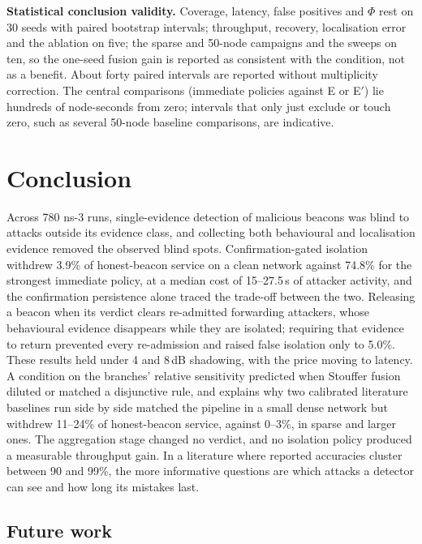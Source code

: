 \textbf{Statistical conclusion validity.} Coverage, latency, false positives
and $\Phi$ rest on 30 seeds with paired bootstrap intervals; throughput,
recovery, localisation error and the ablation on five; the sparse and 50-node
campaigns and the sweeps on ten, so the one-seed fusion gain is reported as
consistent with the condition, not as a benefit. About forty paired intervals
are reported without multiplicity correction. The central comparisons
(immediate policies against E or E$'$) lie hundreds of node-seconds from zero;
intervals that only just exclude or touch zero, such as several 50-node
baseline comparisons, are indicative.

\section{Conclusion}
\label{sec:conclusion}

Across 780 ns-3 runs, single-evidence detection of malicious beacons was blind
to attacks outside its evidence class, and collecting both behavioural and
localisation evidence removed the observed blind spots. Confirmation-gated
isolation withdrew 3.9\% of honest-beacon service on a clean network against
74.8\% for the strongest immediate policy, at a median cost of 15--27.5\,s of
attacker activity, and the confirmation persistence alone traced the
trade-off between the two. Releasing a beacon when its verdict clears
re-admitted forwarding attackers, whose behavioural evidence disappears while
they are isolated; requiring that evidence to return prevented every
re-admission and raised false isolation only to 5.0\%. These results held
under 4 and 8\,dB shadowing, with the price moving to latency. A condition on
the branches' relative sensitivity predicted when Stouffer fusion diluted or
matched a disjunctive rule, and explains why two calibrated literature
baselines run side by side matched the pipeline in a small dense network but
withdrew 11--24\% of honest-beacon service, against 0--3\%, in sparse and
larger ones. The aggregation stage changed no verdict, and no isolation policy
produced a measurable throughput gain. In a literature where reported
accuracies cluster between 90 and 99\%, the more informative questions are
which attacks a detector can see and how long its mistakes last.

\subsection{Future work}
\label{sec:future}

